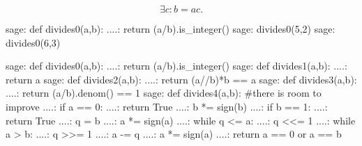 \begin{definition}[\Wrap{content/magyar=Oszreturntó, content/english=Divisor}]
  \[ \exists c: b = ac.\]
\end{definition}

\begin{exercise}
  \begin{sageexample}
    sage: def divides0(a,b):
    ....:     return (a/b).is_integer()
    sage: divides0(5,2)
    sage: divides0(6,3)
  \end{sageexample}

  \begin{solution}
    \begin{sageexample}
        sage: def divides0(a,b):
        ....:     return (a/b).is_integer()
        sage: def divides1(a,b):
        ....:     return a %
        sage: def divides2(a,b):
        ....:     return (a//b)*b == a
        sage: def divides3(a,b):
        ....:     return (a/b).denom() == 1
        sage: def divides4(a,b): #there is room to improve
        ....:     if a == 0:
        ....:         return True
        ....:     b *= sign(b)
        ....:     if b == 1:
        ....:         return True
        ....:     q = b
        ....:     a *= sign(a)
        ....:     while q <= a:
        ....:         q <<= 1
        ....:     while a > b:
        ....:         q >>= 1
        ....:         a -= q
        ....:         a *= sign(a)
        ....:     return a == 0 or a == b

      \end{sageexample}
  \end{solution}
\end{exercise}

